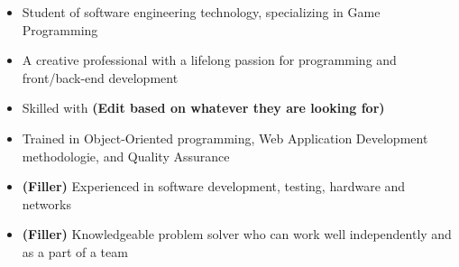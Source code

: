 \documentclass[letter,10pt]{article}
\begin{document}


\begin{itemize}
  \item Student of software engineering technology, specializing in Game Programming
  \item A creative professional with a lifelong passion for programming and front/back-end development
  \item Skilled with \textbf{(Edit based on whatever they are looking for)}
  \item Trained in Object-Oriented programming, Web Application Development methodologie, and Quality Assurance
  \item \textbf{(Filler)} Experienced in software development, testing, hardware and networks
  \item \textbf{(Filler)} Knowledgeable problem solver who can work well independently and as a part of a team

\end{itemize}
\end{document}
